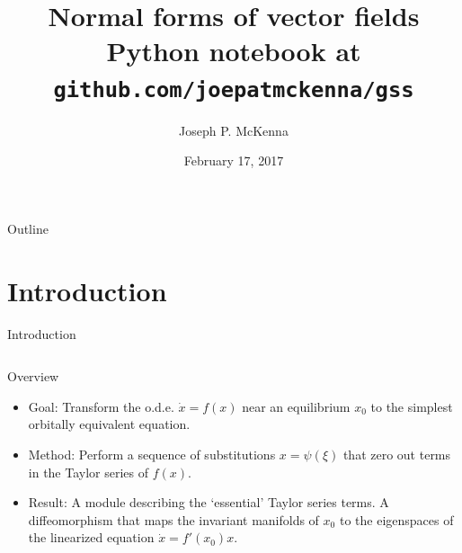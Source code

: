 \documentclass[10pt,T]{beamer}
\title[Normal forms of vector fields]{Normal forms of vector fields\\ \small{Python notebook at \texttt{github.com/joepatmckenna/gss}}}
\author[McKenna, Joseph P.]{Joseph P. McKenna}
\institute[Florida State University] 
{
  {\small Graduate Student Seminar\\}
}
\date[February 17, 2017]{February 17, 2017}
\begin{document}

%
%
%
%
\begin{frame}
\titlepage
\end{frame}

\begin{frame}{Outline}
\tableofcontents
\end{frame}

\section{Introduction}

\begin{frame}{Introduction}
\begin{columns}[T,onlytextwidth]	
\column{\textwidth}
\begin{block}{Overview}
\begin{itemize}
\item Goal: Transform the o.d.e. $\dot{x}=f(x)$ near an
  equilibrium $x_0$ to the simplest orbitally equivalent equation.\\[5mm]
\item Method: Perform a sequence of substitutions $x=\psi(\xi)$ that
  zero out terms in the Taylor series of $f(x)$.\\[5mm]
  \item Result: A module describing the `essential' Taylor series terms. A diffeomorphism that maps the
    invariant manifolds of $x_0$ to the eigenspaces of the linearized equation $\dot{x}=f'(x_0)x$.
\end{itemize}
\end{block}
\end{columns}
\end{frame}
\end{document}
